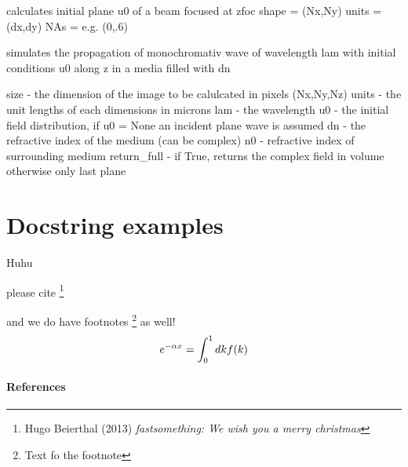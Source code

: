 \documentclass[letterpaper,10pt,english]{sphinxmanual}
\begin{document}

\begin{fulllineitems}
\label{bpm:bpm.psf_u0}
calculates initial plane u0 of a beam focused at zfoc
shape = (Nx,Ny)
units = (dx,dy)
NAs = e.g. (0,.6)

\end{fulllineitems}


\begin{fulllineitems}
\label{bpm:bpm.bpm_3d}
simulates the propagation of monochromativ wave of wavelength lam with initial conditions u0 along z in a media filled with dn

size     -    the dimension of the image to be calulcated  in pixels (Nx,Ny,Nz)
units    -    the unit lengths of each dimensions in microns
lam      -    the wavelength
u0       -    the initial field distribution, if u0 = None an incident  plane wave is assumed
dn       -    the refractive index of the medium (can be complex)
n0       -    refractive index of surrounding medium
return\_full - if True, returns the complex field in volume otherwise only last plane

\end{fulllineitems}



\section{Docstring examples}
\label{docstring_examples:docstring-examples}\label{docstring_examples:module-abc_pack.docstring_examples}\label{docstring_examples::doc}
Huhu

\begin{fulllineitems}
\label{docstring_examples:abc_pack.docstring_examples.citing_me}
please cite \footnote[1]{
Hugo Beierthal (2013) \emph{fastsomething: We wish you a merry christmas}
}

and we do have footnotes \footnote[2]{
Text fo the footnote
} as well!
\begin{gather}
\begin{split}e^{-\alpha x} = \int_0^1 dk f(k)\end{split}\notag
\end{gather}\paragraph{References}

\end{fulllineitems}
\end{document}

